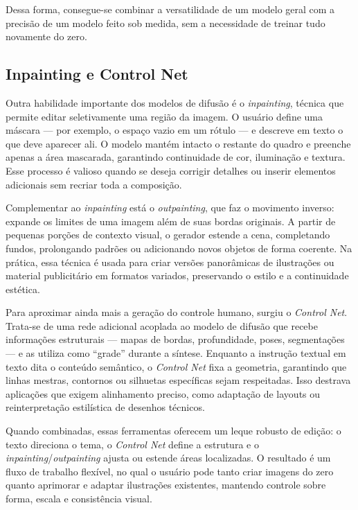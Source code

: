 \documentclass[12pt, %
openright, 
oneside, %
a4paper,    %
brazil]{facom-ufu-abntex2}
\begin{document}
Dessa forma, consegue-se combinar a versatilidade de um modelo geral com a precisão de um modelo feito sob medida, sem a necessidade de treinar tudo novamente do zero.

\subsection*{Inpainting e Control Net}

Outra habilidade importante dos modelos de difusão é o \emph{inpainting}, técnica que permite editar seletivamente uma região da imagem. O usuário define uma máscara — por exemplo, o espaço vazio em um rótulo — e descreve em texto o que deve aparecer ali. O modelo mantém intacto o restante do quadro e preenche apenas a área mascarada, garantindo continuidade de cor, iluminação e textura. Esse processo é valioso quando se deseja corrigir detalhes ou inserir elementos adicionais sem recriar toda a composição.

Complementar ao \emph{inpainting} está o \emph{outpainting}, que faz o movimento inverso: expande os limites de uma imagem além de suas bordas originais. A partir de pequenas porções de contexto visual, o gerador estende a cena, completando fundos, prolongando padrões ou adicionando novos objetos de forma coerente. Na prática, essa técnica é usada para criar versões panorâmicas de ilustrações ou material publicitário em formatos variados, preservando o estilo e a continuidade estética.

Para aproximar ainda mais a geração do controle humano, surgiu o \textit{Control Net}. Trata-se de uma rede adicional acoplada ao modelo de difusão que recebe informações estruturais — mapas de bordas, profundidade, poses, segmentações — e as utiliza como ``grade'' durante a síntese. Enquanto a instrução textual em texto dita o conteúdo semântico, o \textit{Control Net} fixa a geometria, garantindo que linhas mestras, contornos ou silhuetas específicas sejam respeitadas. Isso destrava aplicações que exigem alinhamento preciso, como adaptação de layouts ou reinterpretação estilística de desenhos técnicos.

Quando combinadas, essas ferramentas oferecem um leque robusto de edição: o texto direciona o tema, o \textit{Control Net} define a estrutura e o \emph{inpainting}/\emph{outpainting} ajusta ou estende áreas localizadas. O resultado é um fluxo de trabalho flexível, no qual o usuário pode tanto criar imagens do zero quanto aprimorar e adaptar ilustrações existentes, mantendo controle sobre forma, escala e consistência visual.
\end{document}
